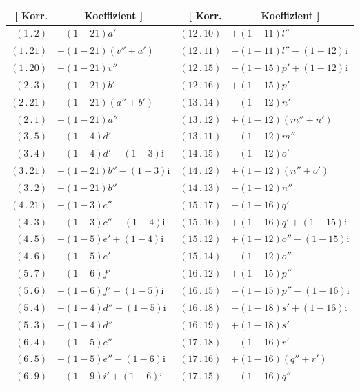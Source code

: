 \begin{center}
\begin{tabular}{|r|l||r|l|}
\hline
[ Korr.&\multicolumn{1}{c||}{Koeffizient ]}&[ Korr.&\multicolumn{1}{c|}{Koeffizient ]}\\
\hline
\((1\,.\,2)\)&\(-(1-21)a'\)&\((12\,.\,10)\)&\(+(1-11)l''\)\\
\((1\,.\,21)\)&\(+(1-21)(v''+a')\)&\((12\,.\,11)\)&\(-(1-11)l''-(1-12)\mathrm{i}\)\\
\((1\,.\,20)\)&\(-(1-21)v''\)&\((12\,.\,15)\)&\(-(1-15)p'+(1-12)\mathrm{i}\)\\
\((2\,.\,3)\)&\(-(1-21)b'\)&\((12\,.\,16)\)&\(+(1-15)p'\)\\
\((2\,.\,21)\)&\(+(1-21)(a''+b')\)&\((13\,.\,14)\)&\(-(1-12)n'\)\\
\((2\,.\,1)\)&\(-(1-21)a''\)&\((13\,.\,12)\)&\(+(1-12)(m''+n')\)\\
\((3\,.\,5)\)&\(-(1-4)d'\)&\((13\,.\,11)\)&\(-(1-12)m''\)\\
\((3\,.\,4)\)&\(+(1-4)d'+(1-3)\mathrm{i}\)&\((14\,.\,15)\)&\(-(1-12)o'\)\\
\((3\,.\,21)\)&\(+(1-21)b''-(1-3)\mathrm{i}\)&\((14\,.\,12)\)&\(+(1-12)(n''+o')\)\\
\((3\,.\,2)\)&\(-(1-21)b''\)&\((14\,.\,13)\)&\(-(1-12)n''\)\\
\((4\,.\,21)\)&\(+(1-3)c''\)&\((15\,.\,17)\)&\(-(1-16)q'\)\\
\((4\,.\,3)\)&\(-(1-3)c''-(1-4)\mathrm{i}\)&\((15\,.\,16)\)&\(+(1-16)q'+(1-15)\mathrm{i}\)\\
\((4\,.\,5)\)&\(-(1-5)e'+(1-4)\mathrm{i}\)&\((15\,.\,12)\)&\(+(1-12)o''-(1-15)\mathrm{i}\)\\
\((4\,.\,6)\)&\(+(1-5)e'\)&\((15\,.\,14)\)&\(-(1-12)o''\)\\
\((5\,.\,7)\)&\(-(1-6)f'\)&\((16\,.\,12)\)&\(+(1-15)p''\)\\
\((5\,.\,6)\)&\(+(1-6)f'+(1-5)\mathrm{i}\)&\((16\,.\,15)\)&\(-(1-15)p''-(1-16)\mathrm{i}\)\\
\((5\,.\,4)\)&\(+(1-4)d''-(1-5)\mathrm{i}\)&\((16\,.\,18)\)&\(-(1-18)s'+(1-16)\mathrm{i}\)\\
\((5\,.\,3)\)&\(-(1-4)d''\)&\((16\,.\,19)\)&\(+(1-18)s'\)\\
\((6\,.\,4)\)&\(+(1-5)e''\)&\((17\,.\,18)\)&\(-(1-16)r'\)\\
\((6\,.\,5)\)&\(-(1-5)e''-(1-6)\mathrm{i}\)&\((17\,.\,16)\)&\(+(1-16)(q''+r')\)\\
\((6\,.\,9)\)&\(-(1-9)i'+(1-6)\mathrm{i}\)&\((17\,.\,15)\)&\(-(1-16)q''\)\\

\end{tabular}
\end{center}
